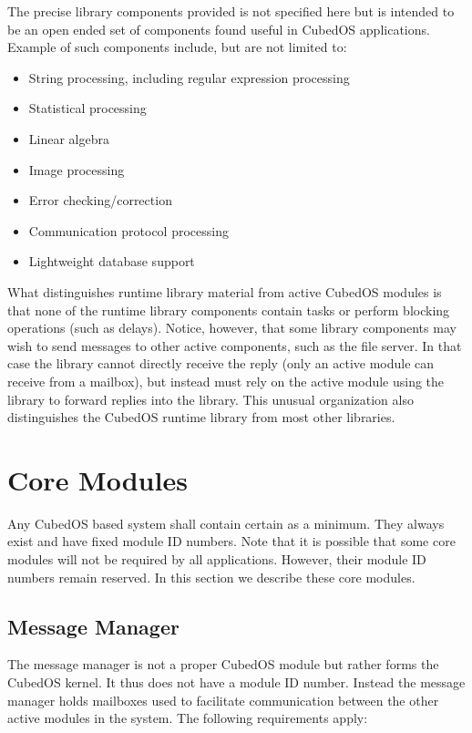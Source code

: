 The precise library components provided is not specified here but is intended to be an open
ended set of components found useful in CubedOS applications. Example of such components
include, but are not limited to:

\begin{itemize}
\item String processing, including regular expression processing
\item Statistical processing
\item Linear algebra
\item Image processing
\item Error checking/correction
\item Communication protocol processing
\item Lightweight database support
\end{itemize}

What distinguishes runtime library material from active CubedOS modules is that none of the
runtime library components contain tasks or perform blocking operations (such as delays).
Notice, however, that some library components may wish to send messages to other active
components, such as the file server. In that case the library cannot directly receive the reply
(only an active module can receive from a mailbox), but instead must rely on the active module
using the library to forward replies into the library. This unusual organization also
distinguishes the CubedOS runtime library from most other libraries.

\section{Core Modules}
\label{sec:core-modules}

Any CubedOS based system shall contain certain  as a minimum. They always
exist and have fixed module ID numbers. Note that it is possible that some core modules will not
be required by all applications. However, their module ID numbers remain reserved. In this
section we describe these core modules.

\subsection{Message Manager}
\label{sec:message-manager}

The message manager is not a proper CubedOS module but rather forms the CubedOS kernel. It thus
does not have a module ID number. Instead the message manager holds mailboxes used to facilitate
communication between the other active modules in the system. The following requirements apply:

